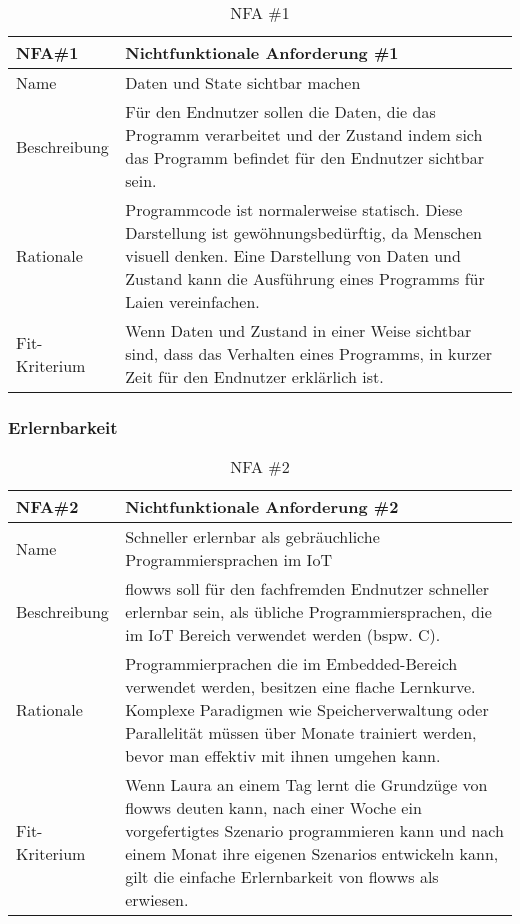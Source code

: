 \begin{table}[H]
\caption{NFA \#1}
\label{tab:NFA1}
\begin{tabularx}{\textwidth}{lX}
\hline
\rowcolor[HTML]{EFEFEF} 
NFA\#1        & Nichtfunktionale Anforderung \#1 \\ \hline
Name          & Daten und State sichtbar machen \\ \hline
Beschreibung  & Für den Endnutzer sollen die Daten, die das Programm verarbeitet und der Zustand indem sich das Programm befindet für den Endnutzer sichtbar sein. \\ \hline
Rationale     & Programmcode ist normalerweise statisch. Diese Darstellung ist gewöhnungsbedürftig, da Menschen visuell denken. Eine Darstellung von Daten und Zustand kann die Ausführung eines Programms für Laien vereinfachen. \\ \hline
Fit-Kriterium & Wenn Daten und Zustand in einer Weise sichtbar sind, dass das Verhalten eines Programms, in kurzer Zeit für den Endnutzer erklärlich ist. \\ \hline
\end{tabularx}
\end{table}

\subsubsection{Erlernbarkeit}
\begin{table}[H]
\caption{NFA \#2}
\label{tab:NFA2}
\begin{tabularx}{\textwidth}{lX}
\hline
\rowcolor[HTML]{EFEFEF} 
NFA\#2        & Nichtfunktionale Anforderung \#2 \\ \hline
Name          & Schneller erlernbar als gebräuchliche Programmiersprachen im \ac{IoT} \\ \hline
Beschreibung  & flowws soll für den fachfremden Endnutzer schneller erlernbar sein, als übliche Programmiersprachen, die im IoT Bereich verwendet werden (bspw. C).\\ \hline
Rationale     & Programmierprachen die im Embedded-Bereich verwendet werden, besitzen eine flache Lernkurve. Komplexe Paradigmen wie Speicherverwaltung oder Parallelität müssen über Monate trainiert werden, bevor man effektiv mit ihnen umgehen kann. \\ \hline
Fit-Kriterium & Wenn Laura an einem Tag lernt die Grundzüge von flowws deuten kann, nach einer Woche ein vorgefertigtes Szenario programmieren kann und nach einem Monat ihre eigenen Szenarios entwickeln kann, gilt die einfache Erlernbarkeit von flowws als erwiesen. \\ \hline
\end{tabularx}
\end{table}

